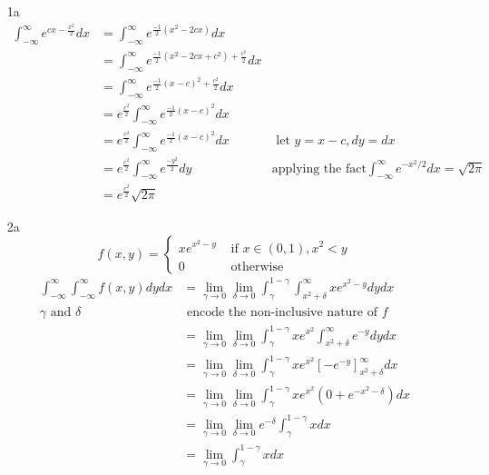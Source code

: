 \documentclass[12pt, letterpaper]{article}
\begin{document}
\begin{enumerate}
\begin{enumerate}
{unordered sample.}\\
		Here we multiply the number of valid ways to take Es then the N 
		$\displaystyle \frac{\binom{5}{2}\binom{4}{1}\binom{3}{1}}{\binom{14}{4}} = \frac{120}{1001}\approx 1\%$
	\end{enumerate}
	\item[1a]
	\begin{align*}
		\int_{-\infty}^\infty e^{cx-\frac{x^2}{2}}dx &= \int_{-\infty}^\infty e^{\frac{-1}{2}(x^2-2cx)}dx\\
		&= \int_{-\infty}^\infty e^{\frac{-1}{2}(x^2-2cx+c^2)+\frac{c^2}{2}}dx\\
		&= \int_{-\infty}^\infty e^{\frac{-1}{2}(x-c)^2+\frac{c^2}{2}}dx\\
		&= e^\frac{c^2}{2}\int_{-\infty}^\infty e^{\frac{-1}{2}(x-c)^2}dx\\
		&= e^\frac{c^2}{2}\int_{-\infty}^\infty e^{\frac{-1}{2}(x-c)^2}dx & \text{ let } y=x-c, dy = dx\\
		&= e^\frac{c^2}{2}\int_{-\infty}^\infty e^{\frac{-y^2}{2}}dy & \text{applying the fact} \int_{-\infty}^\infty e^{-x^2/2}dx = \sqrt{2\pi}\\
		&= e^\frac{c^2}{2}\sqrt{2\pi}
	\end{align*}
	\item[2a] 
	$$
	f(x,y) = \begin{cases}
		xe^{x^2-y} & \text{ if } x \in (0,1), x^2 < y\\
		0 & \text{ otherwise}	
	\end{cases}
	$$
		\begin{align*}
			\int_{-\infty}^\infty \int_{-\infty}^\infty f(x,y) dy dx &= \lim_{\gamma \to 0} \lim_{\delta \to 0} \int_\gamma^{1-\gamma}\int_{x^2+\delta}^\infty xe^{x^2-y} dy dx\\
			 \gamma \text{ and } \delta & \text{ encode the non-inclusive nature of } f\\
			 &= \lim_{\gamma \to 0} \lim_{\delta \to 0} \int_\gamma^{1-\gamma}xe^{x^2} \int_{x^2+\delta}^\infty e^{-y} dy dx\\
			 &= \lim_{\gamma \to 0} \lim_{\delta \to 0} \int_\gamma^{1-\gamma}xe^{x^2} [-e^{-y}]_{x^2+\delta}^\infty dx\\
			 &= \lim_{\gamma \to 0} \lim_{\delta \to 0} \int_\gamma^{1-\gamma}xe^{x^2} (0+e^{-x^2-\delta}) dx\\
			 &= \lim_{\gamma \to 0} \lim_{\delta \to 0} e^{-\delta}  \int_\gamma^{1-\gamma}xdx\\
			 &= \lim_{\gamma \to 0} \int_\gamma^{1-\gamma}xdx\\

\end{align*}
\end{enumerate}
\end{document}
